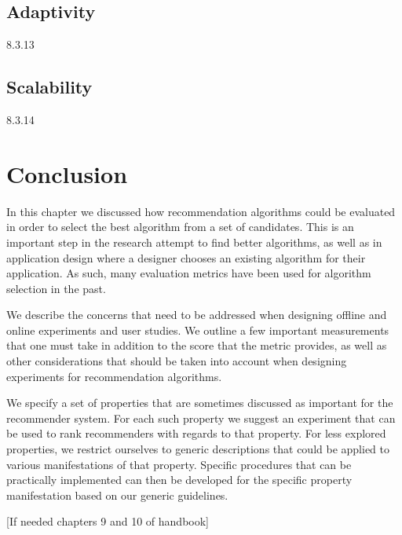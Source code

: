 \subsection{Adaptivity}
{8.3.13}

\subsection{Scalability}
{8.3.14}

\section{Conclusion}

In this chapter we discussed how recommendation algorithms could be evaluated in order to select the best algorithm from a set of candidates. This is an important step in the research attempt to find better algorithms, as well as in application design where a designer chooses an existing algorithm for their application. As such, many evaluation metrics have been used for algorithm selection in the past.

We describe the concerns that need to be addressed when designing offline and online experiments and user studies. We outline a few important measurements that one must take in addition to the score that the metric provides, as well as other considerations that should be taken into account when designing experiments for recommendation algorithms.

We specify a set of properties that are sometimes discussed as important for the recommender system. For each such property we suggest an experiment that can be used to rank recommenders with regards to that property. For less explored properties, we restrict ourselves to generic descriptions that could be applied to various manifestations of that property. Specific procedures that can be practically implemented can then be developed for the specific property manifestation based on our generic guidelines.

[If needed chapters 9 and 10 of handbook]
